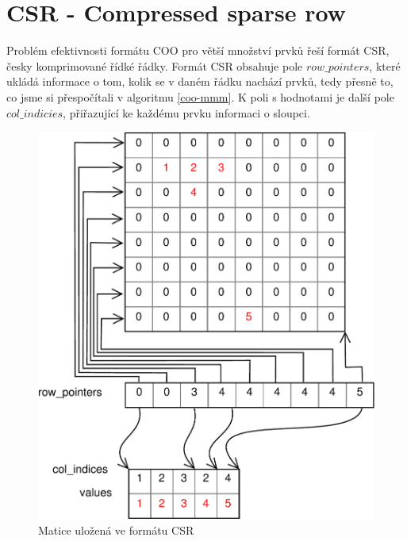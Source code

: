 
\section{CSR - Compressed sparse row}

Problém efektivnosti formátu COO pro větší množství prvků řeší formát CSR, česky komprimované řídké řádky. Formát CSR obsahuje pole $row\_pointers$, které ukládá informace o tom, kolik se v daném řádku nachází prvků, tedy přesně to, co jsme si přespočítali v algoritmu \ref{coo-mmm}. K poli s hodnotami je další pole $col\_indicies$, přiřazující ke každému prvku informaci o sloupci.

\begin{figure}[H]\centering
	\includegraphics[width=\textwidth]{./images/csr/csr}
	\caption{Matice uložená ve formátu CSR}
	\label{fig:CSR}
\end{figure}

